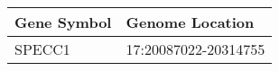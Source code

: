 \begin{tabular}{ll}
\toprule
Gene Symbol &      Genome Location \\
\midrule
     SPECC1 & 17:20087022-20314755 \\
\bottomrule
\end{tabular}
